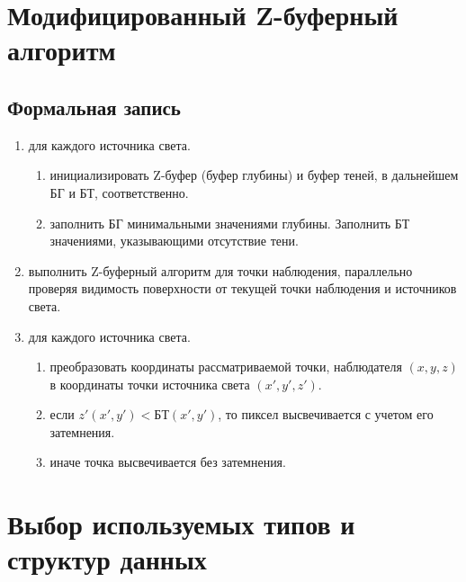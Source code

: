 \clearpage


\clearpage



\section{Модифицированный Z-буферный алгоритм}

\subsection{Формальная запись}

\begin{enumerate}
	\item для каждого источника света.
	 
	 \begin{enumerate}[label=\arabic{enumi}.\arabic*]
	 	\item инициализировать Z-буфер (буфер глубины)  и буфер теней, в дальнейшем БГ и БТ, соответственно.
	 	\item заполнить БГ минимальными значениями глубины.
	 	Заполнить БТ значениями, указывающими отсутствие тени.
	 \end{enumerate}

	\item выполнить Z-буферный алгоритм для точки наблюдения, параллельно проверяя видимость поверхности от текущей точки наблюдения и источников света.
    \item для каждого источника света.
    
    \begin{enumerate}[label=\arabic{enumi}.\arabic*]
    \item преобразовать координаты рассматриваемой точки, наблюдателя $(x, y, z)$ в координаты точки источника света $(x', y', z')$.
    \item если $z'(x', y') < БТ(x', y')$, то пиксел высвечивается с учетом его затемнения.
    \item  иначе точка высвечивается без затемнения.
   	\end{enumerate}
   
   
\end{enumerate}


\clearpage


\section{Выбор используемых типов и структур данных}



